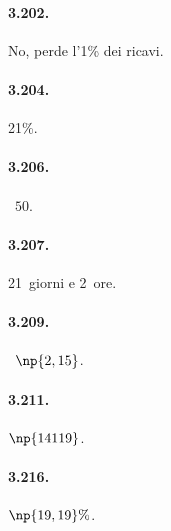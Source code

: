\begin{multicols}{2}
\paragraph{3.202.} No, perde l'1\% dei ricavi.

\paragraph{3.204.} 21\%.

\paragraph{3.206.} \officialeuro~$50$.

\paragraph{3.207.} 21~giorni e 2~ore.

\paragraph{3.209.} \officialeuro~$\np{2,15}$.

\paragraph{3.211.} $\np{14119}$.

\paragraph{3.216.} $\np{19,19}\%$.

\end{multicols}
